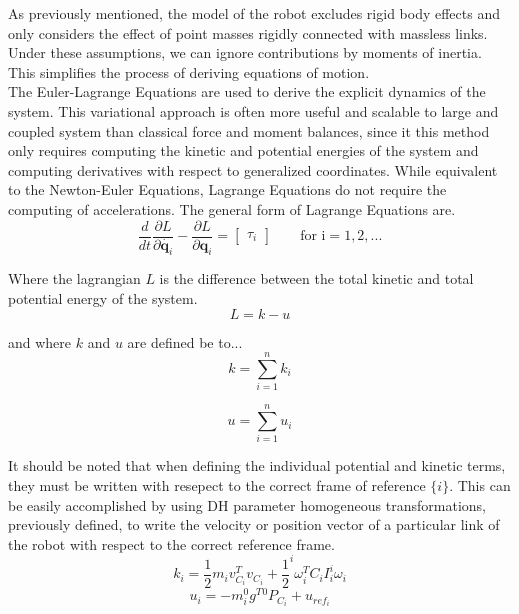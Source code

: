 \documentclass[journal]{IEEEtran}
\begin{document}
As previously mentioned, the model of the robot excludes rigid body effects and only considers the effect of point masses rigidly connected with massless links. Under these assumptions, we can ignore contributions by moments of inertia. This simplifies the process of deriving equations of motion. \\

The Euler-Lagrange Equations are used to derive the explicit dynamics of the system. This variational approach is often more useful and scalable to large and coupled system than classical force and moment balances, since it this method only requires computing the kinetic and potential energies of the system and computing derivatives with respect to generalized coordinates. While equivalent to the Newton-Euler Equations, Lagrange Equations do not require the computing of accelerations. The general form of Lagrange Equations are.
\begin{equation}
\frac{d}{d t} \frac{\partial L}{\partial \dot{\boldsymbol{q}_{i}}}-\frac{\partial L}{\partial \boldsymbol{q}_{i}}=\left[\begin{array}{l}
\tau_{i}
\end{array}\right]
 \quad \quad \text{for i} = 1,2,...
\end{equation}

\noindent Where the lagrangian $L$ is the difference between the total kinetic and total potential energy of the system.
\begin{equation}
  L = k - u
\end{equation}

\noindent and where $k$ and $u$ are defined be to...
\begin{equation}
k=\sum_{i=1}^{n} k_{i}
\end{equation}

\begin{equation}
u=\sum_{i=1}^{n} u_{i}
\end{equation}

It should be noted that when defining the individual potential and kinetic terms, they must be written with resepect to the correct frame of reference $\{ i \}$. This can be easily accomplished by using DH parameter homogeneous transformations, previously defined, to write the velocity or position vector of a particular link of the robot with respect to the correct reference frame.
\begin{equation}
k_{i}=\frac{1}{2} m_{i} v_{C_{i}}^{T} v_{C_{i}}+\frac{1}{2}^{i} \omega_{i}^{T} C_{i} I_{i}^{i} \omega_{i}
\end{equation}
\begin{equation}
u_{i}=-m_{i}^{0} g^{T}{ }^{0} P_{C_{i}}+u_{r e f_{i}}
\end{equation}
\end{document}
